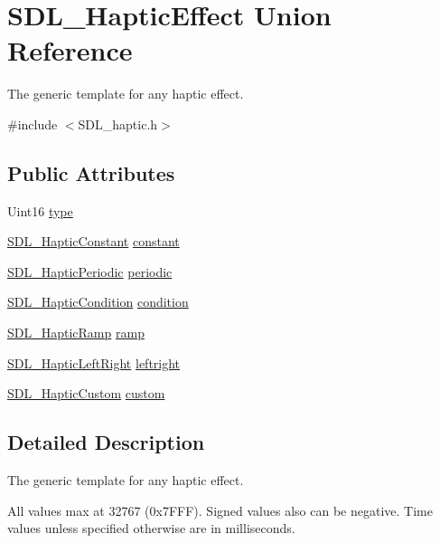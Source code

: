\hypertarget{unionSDL__HapticEffect}{\section{S\+D\+L\+\_\+\+Haptic\+Effect Union Reference}
\label{unionSDL__HapticEffect}
}


The generic template for any haptic effect.  




{\ttfamily \#include $<$S\+D\+L\+\_\+haptic.\+h$>$}

\subsection*{Public Attributes}
\begin{DoxyCompactItemize}
\item 
Uint16 \hyperlink{unionSDL__HapticEffect_a5ff6cfd8da91537091e9a6c2108cb179}{type}
\item 
\hyperlink{structSDL__HapticConstant}{S\+D\+L\+\_\+\+Haptic\+Constant} \hyperlink{unionSDL__HapticEffect_ac435275e9683d6cc5d65b9c7cc2ec659}{constant}
\item 
\hyperlink{structSDL__HapticPeriodic}{S\+D\+L\+\_\+\+Haptic\+Periodic} \hyperlink{unionSDL__HapticEffect_a8320ec4db6ec1dc1d30feb62ee2a2f04}{periodic}
\item 
\hyperlink{structSDL__HapticCondition}{S\+D\+L\+\_\+\+Haptic\+Condition} \hyperlink{unionSDL__HapticEffect_aa8fdd1ba202ccd7e61f48ef9977080d2}{condition}
\item 
\hyperlink{structSDL__HapticRamp}{S\+D\+L\+\_\+\+Haptic\+Ramp} \hyperlink{unionSDL__HapticEffect_a1d32ef4c2d1cc89dc938b392f6ad81bd}{ramp}
\item 
\hyperlink{structSDL__HapticLeftRight}{S\+D\+L\+\_\+\+Haptic\+Left\+Right} \hyperlink{unionSDL__HapticEffect_a3c254b81c1ff41c7888eee0cd0076a12}{leftright}
\item 
\hyperlink{structSDL__HapticCustom}{S\+D\+L\+\_\+\+Haptic\+Custom} \hyperlink{unionSDL__HapticEffect_a0b2d2af28c515cc39896b2b7c23019d2}{custom}
\end{DoxyCompactItemize}


\subsection{Detailed Description}
The generic template for any haptic effect. 

All values max at 32767 (0x7\+F\+F\+F). Signed values also can be negative. Time values unless specified otherwise are in milliseconds.

